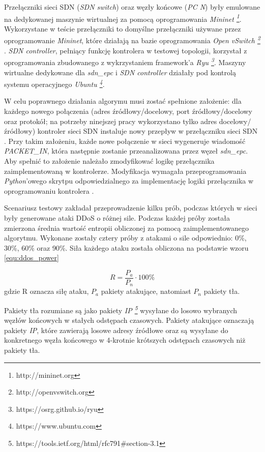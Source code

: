 Przełączniki sieci SDN (\textit{SDN switch}) oraz węzły końcowe (\textit{PC
  N}) były emulowane na dedykowanej maszynie wirtualnej za pomocą oprogramowania
\textit{Mininet \footnote{http://mininet.org}}. Wykorzystane w teście
przełączniki to domyślne przełączniki używane przez oprogramowanie
\textit{Mininet}, które działają na bazie oprogramowania
\textit{Open vSwitch \footnote{http://openvswitch.org}} \cite{mininetwiki}.
\textit{SDN controller}, pełniący funkcję kontrolera w testowej topologii,
korzystał z oprogramowania zbudowanego z wykrzystaniem framework'a
\textit{Ryu \footnote{https://osrg.github.io/ryu}}. Maszyny wirtualne dedykowane
dla \textit{sdn\_epc} i \textit{SDN controller} działały pod kontrolą systemu
operacyjnego \textit{Ubuntu \footnote{https://www.ubuntu.com}}.

W celu poprawnego działania algorymu musi zostać spełnione założenie: dla
każdego nowego połączenia (adres źródłowy/docelowy, port źródłowy/docelowy oraz
protokół; na potrzeby ninejszej pracy wykorzystano tylko adres
docelowy/źródłowy) kontroler sieci SDN instaluje nowy przepływ w przełączniku
sieci SDN \cite{mainddosarticle}. Przy takim założeniu, każde nowe połączenie w
sieci wygeneruje wiadomość \textit{PACKET\_IN}, która następnie zostanie
przeanalizowana przez węzeł \textit{sdn\_epc}. Aby spełnić to założenie należało
zmodyfikować logikę przełącznika zaimplementowaną w kontrolerze. Modyfikacja
wymagała przeprogramowania \textit{Python}'owego skrytpu odpowiedzialnego za
implementację logiki przełącznika w oprogramowaniu kontrolera \cite{ryupage}.

Scenariusz testowy zakładał przeprowadzenie kilku prób, podczas których w sieci
były generowane ataki DDoS o różnej sile. Podczas każdej próby została zmierzona
średnia wartość entropii obliczonej za pomocą zaimplementowanego algorytmu.
Wykonane zostały cztery próby z atakami o sile odpowiednio: 0\%, 30\%, 60\% oraz
90\%. Siła każdego ataku została obliczona na podstawie wzoru
\ref{equ:ddos_power} \cite{mainddosarticle}

\begin{equation}
R = \frac{P_{a}}{P_{n}} \cdot 100\%
\label{equ:ddos_power}
\end{equation}
gdzie R oznacza siłę ataku, $P_{a}$ pakiety atakujące, natomiast $P_{n}$ pakiety
tła.

Pakiety tła rozumiane są jako pakiety
\textit{IP \footnote{https://tools.ietf.org/html/rfc791\#section-3.1}} wysyłane
do losowo wybranych węzłów końcowych w stałych odstępach czasowych. Pakiety
atakujące oznaczają pakiety \textit{IP}, które zawierają losowe adresy źródłowe
oraz są wysyłane do konkretnego węzła końcowego w 4-krotnie krótszych odstępach
czasowych niż pakiety tła. 

